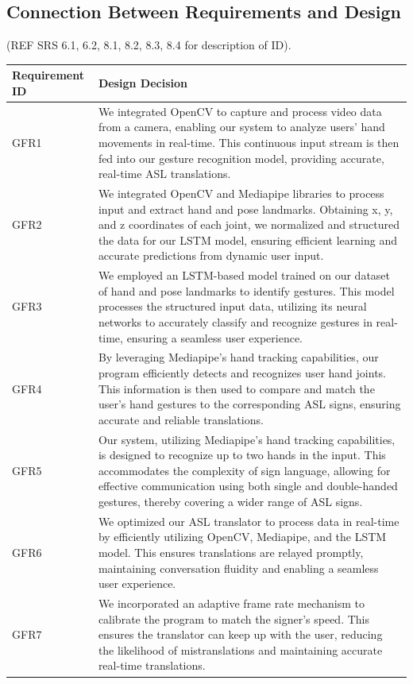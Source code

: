 \documentclass[12pt, titlepage]{article}
\begin{document}
\subsection{Connection Between Requirements and Design} \label{SecConnection}
(REF SRS 6.1, 6.2, 8.1, 8.2, 8.3, 8.4 for description of ID).

\renewcommand{\arraystretch}{1.2}
\noindent \begin{longtable}{p{}|p{}}
\hline
\textbf{Requirement ID} & \textbf{Design Decision}\\
\hline
GFR1
& We integrated OpenCV to capture and process video data from a camera, enabling our system to analyze users' hand movements in real-time. This continuous input stream is then fed into our gesture recognition model, providing accurate, real-time ASL translations.\\
\hline
GFR2
& We integrated OpenCV and Mediapipe libraries to process input and extract hand and pose landmarks. Obtaining x, y, and z coordinates of each joint, we normalized and structured the data for our LSTM model, ensuring efficient learning and accurate predictions from dynamic user input.\\
\hline
GFR3
& We employed an LSTM-based model trained on our dataset of hand and pose landmarks to identify gestures. This model processes the structured input data, utilizing its neural networks to accurately classify and recognize gestures in real-time, ensuring a seamless user experience.\\
\hline
GFR4
& By leveraging Mediapipe's hand tracking capabilities, our program efficiently detects and recognizes user hand joints. This information is then used to compare and match the user's hand gestures to the corresponding ASL signs, ensuring accurate and reliable translations.\\
\hline
GFR5
& Our system, utilizing Mediapipe's hand tracking capabilities, is designed to recognize up to two hands in the input. This accommodates the complexity of sign language, allowing for effective communication using both single and double-handed gestures, thereby covering a wider range of ASL signs.\\
\hline
GFR6
& We optimized our ASL translator to process data in real-time by efficiently utilizing OpenCV, Mediapipe, and the LSTM model. This ensures translations are relayed promptly, maintaining conversation fluidity and enabling a seamless user experience.\\
\hline
GFR7
& We incorporated an adaptive frame rate mechanism to calibrate the program to match the signer's speed. This ensures the translator can keep up with the user, reducing the likelihood of mistranslations and maintaining accurate real-time translations.\\

\end{longtable}
\end{document}
